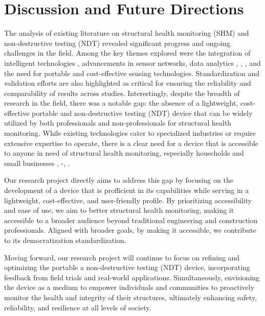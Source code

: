 \documentclass[journal, a4paper]{IEEEtran}
\begin{document}
\section{Discussion and Future Directions} 
The analysis of existing literature on structural health monitoring (SHM) and non-destructive testing (NDT) revealed significant progress and ongoing challenges in the field. Among the key themes explored were the integration of intelligent technologies \cite{yang_broadband_2023}\cite{ziaja_shm_2021}\cite{bevan_automated_2022}, advancements in sensor networks, data analytics \cite{de_sa_rodrigues_probability_2023}, \cite{li_physics-informed_2023}, \cite{tabjula_sparse_2023}, and the need for portable and cost-effective sensing technologies. Standardization and validation efforts are also highlighted as critical for ensuring the reliability and comparability of results across studies. Interestingly, despite the breadth of research in the field, there was a notable gap: the absence of a lightweight, cost-effective portable and non-destructive testing (NDT) device that can be widely utilized by both professionals and non-professionals for structural health monitoring. While existing technologies cater to specialized industries or require extensive expertise to operate, there is a clear need for a device that is accessible to anyone in need of structural health monitoring, especially households and small businesses \cite{ziaja_shm_2021}, \cite{zhang_defect_2020}-\cite{yifei_structure_2023}, \cite{tabjula_sparse_2023} .
 
Our research project directly aims to address this gap by focusing on the development of a device that is profficient in its capabilities while serving in a lightweight, cost-effective, and user-friendly  profile. By prioritizing accessibility and ease of use, we aim to better structural health monitoring, making it accessible to a broader audience beyond traditional engineering and construction professionals.  Aligned with broader goals, by making it accessible, we contribute to its democratization standardization.

Moving forward, our research project will continue to focus on refining and optimizing the portable a non-destructive testing (NDT) device, incorporating feedback from field trials and real-world applications. Simultaneously, envisioning the device as a medium to empower individuals and communities to proactively monitor the health and integrity of their structures, ultimately enhancing safety, reliability, and resilience at all levels of society.
\end{document}
